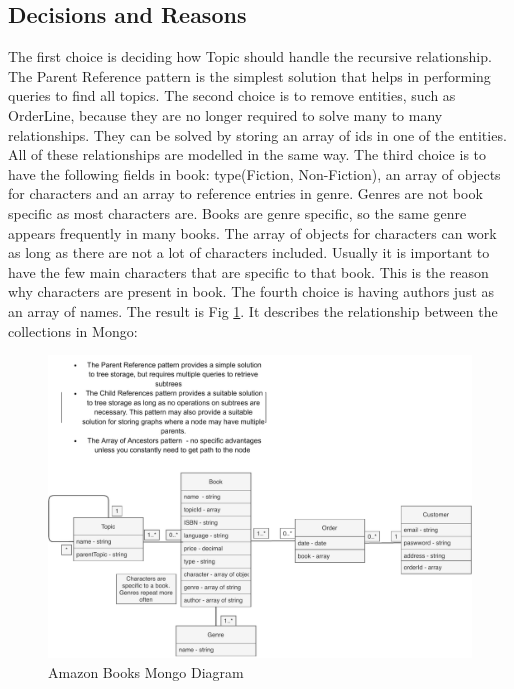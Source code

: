 \documentclass{article}
\begin{document}
	\subsection*{Decisions and Reasons}
	The first choice is deciding how Topic should handle the recursive relationship. The Parent Reference pattern is the simplest solution that helps in performing queries to find all topics. \newline
	The second choice is to remove entities, such as OrderLine, because they are no longer required to solve many to many relationships. They can be solved by storing an array of ids in one of the entities. All of these relationships are modelled in the same way. \newline
	The third choice is to have the following fields in book: type(Fiction, Non-Fiction), an array of objects for characters and an array to reference entries in genre. Genres are not book specific as most characters are. Books are genre specific, so the same genre appears frequently in many books. The array of objects for characters can work as long as there are not a lot of characters included. Usually it is important to have the few main characters that are specific to that book. This is the reason why characters are present in book. \newline
	The fourth choice is having authors just as an array of names. \newline
	The result is Fig \ref{fig:Mongo}. It describes the relationship between the collections in Mongo:
	\begin{figure}[h!]
		\includegraphics[width=\linewidth]{AmazonMongoDB.pdf}
		\caption{Amazon Books Mongo Diagram}
		\label{fig:Mongo}
	\end{figure}
\end{document}
